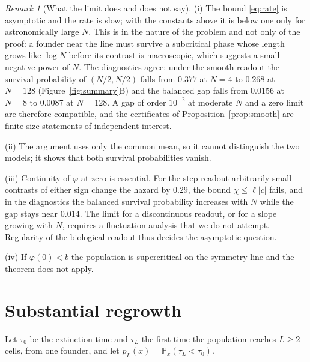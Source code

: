 \documentclass[11pt]{article}
\theoremstyle{remark}
\newtheorem{remark}[theorem]{Remark}
\newcommand{\PP}{\mathbb P}
\begin{document}
\begin{remark}[What the limit does and does not say]\label{rem:boundary}
(i) The bound \eqref{eq:rate} is asymptotic and the rate is slow; with the
constants above it is below one only for astronomically large $N$. This is in
the nature of the problem and not only of the proof: a founder near the line
must survive a subcritical phase whose length grows like $\log N$ before its
contrast is macroscopic, which suggests a small negative power of $N$. The
diagnostics agree: under the smooth readout the survival probability of
$(N/2,N/2)$ falls from $0.377$ at $N=4$ to $0.268$ at $N=128$
(Figure~\ref{fig:summary}B) and the balanced gap falls from $0.0156$ at
$N=8$ to $0.0087$ at $N=128$. A gap of order $10^{-2}$ at moderate $N$ and a
zero limit are therefore compatible, and the certificates of
Proposition~\ref{prop:smooth} are finite-size statements of independent
interest.

(ii) The argument uses only the common mean, so it cannot distinguish the two
models; it shows that both survival probabilities vanish.

(iii) Continuity of $\varphi$ at zero is essential. For the step readout
arbitrarily small contrasts of either sign change the hazard by $0.29$, the
bound $\chi\le\ell|c|$ fails, and in the diagnostics the balanced survival
probability increases with $N$ while the gap stays near $0.014$. The limit
for a discontinuous readout, or for a slope growing with $N$, requires a
fluctuation analysis that we do not attempt. Regularity of the biological
readout thus decides the asymptotic question.

(iv) If $\varphi(0)<b$ the population is supercritical on the symmetry line
and the theorem does not apply.
\end{remark}

\section{Substantial regrowth}\label{sec:regrowth}

Let $\tau_0$ be the extinction time and $\tau_L$ the first time the population
reaches $L\ge2$ cells, from one founder, and let $p_L(x)=\PP_x(\tau_L<\tau_0)$.
\end{document}
